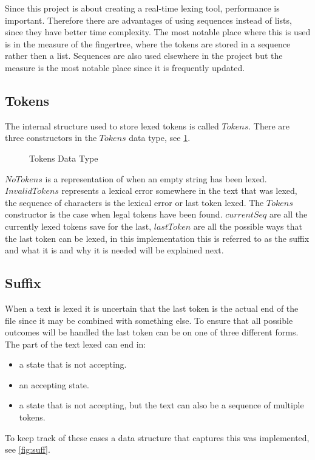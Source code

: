 Since this project is about creating a real-time lexing tool, performance is
important. Therefore there are advantages of using sequences instead of lists,
since they have better time complexity. The most notable place where this is
used is in the measure of the fingertree, where the tokens are stored in a
sequence rather then a list. Sequences are also used elsewhere in the project
but the measure is the most notable place since it is frequently updated.

\subsection{Tokens}
The internal structure used to store lexed tokens is called $Tokens$. There are
three constructors in the $Tokens$ data type, see \cref{fig:tokens}.

\begin{figure}[h!]
  
  \caption{Tokens Data Type\label{fig:tokens}}
\end{figure}

$NoTokens$ is a representation of when an empty string has been lexed.
$InvalidTokens$ represents a lexical error somewhere in the text that was lexed,
the sequence of characters is the lexical error or last token lexed. The
$Tokens$ constructor is the case when legal tokens have been found. $currentSeq$
are all the currently lexed tokens save for the last, $lastToken$ are all the
possible ways that the last token can be lexed, in this implementation this is
referred to as the suffix and what it is and why it is needed will be explained
next.

\subsection{Suffix}\label{sub:suff}
When a text is lexed it is uncertain that the last token is the actual end of
the file since it may be combined with something else. To ensure that all
possible outcomes will be handled the last token can be on one of three
different forms. The part of the text lexed can end in:
\begin{itemize}
\item a state that is not accepting.
\item an accepting state.
\item a state that is not accepting, but the text can also be a sequence
  of multiple tokens.
\end{itemize}
To keep track of these cases a data structure that captures this was
implemented, see \cref{fig:suff}.

